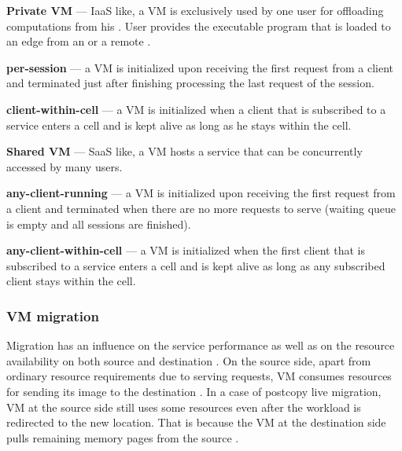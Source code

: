 \textbf{Private VM} --- IaaS like, a VM is exclusively used by one user for offloading computations from his \ue{}.
User provides the executable program that is loaded to an edge \dc{} from an \ue{} or a remote \dc{}.
		\begin{description}
			\item \textbf{per-session} --- a VM is initialized upon receiving the first request from a client and terminated just after finishing processing the last request of the session.
			\item \textbf{client-within-cell} --- a VM is initialized when a client that is subscribed to a service enters a cell and is kept alive as long as he stays within the cell. 
		\end{description}
			
\textbf{Shared VM} --- SaaS like, a VM hosts a service that can be concurrently accessed by many users.
		\begin{description}
			\item \textbf{any-client-running} --- a VM is initialized upon receiving the first request from a client and terminated when there are no more requests to serve (waiting queue is empty and all sessions are finished).
			\item \textbf{any-client-within-cell} --- a VM is initialized when the first client that is subscribed to a service enters a cell and is kept alive as long as any subscribed client stays within the cell. 
		\end{description}

\subsubsection{VM migration}
Migration has an influence on the service performance as well as on the resource availability on both source and destination \dc{}.
On the source side, apart from ordinary resource requirements due to serving requests, VM consumes resources for sending its image to the destination \dc{}.
In a case of postcopy live migration, VM at the source side still uses some resources even after the workload is redirected to the new location.
That is because the VM at the destination side pulls remaining memory pages from the source \dc{}.


